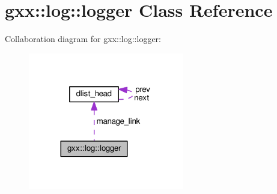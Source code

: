 \hypertarget{classgxx_1_1log_1_1logger}{}\section{gxx\+:\+:log\+:\+:logger Class Reference}
\label{classgxx_1_1log_1_1logger}


Collaboration diagram for gxx\+:\+:log\+:\+:logger\+:
\nopagebreak
\begin{figure}[H]
\begin{center}
\leavevmode
\includegraphics[width=192pt]{classgxx_1_1log_1_1logger__coll__graph}
\end{center}
\end{figure}
